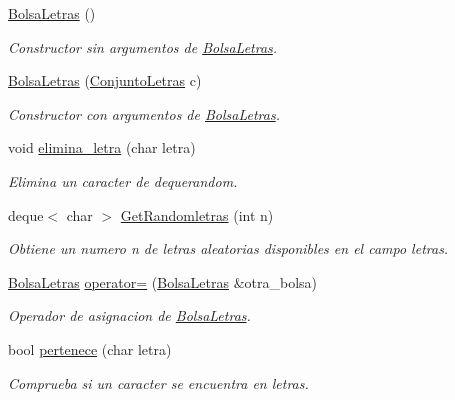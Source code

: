 \begin{DoxyCompactItemize}
\item 
\hyperlink{class_bolsa_letras_a2e269014b3a51359195e7b288a4b37c6}{Bolsa\+Letras} ()\hypertarget{class_bolsa_letras_a2e269014b3a51359195e7b288a4b37c6}{}\label{class_bolsa_letras_a2e269014b3a51359195e7b288a4b37c6}

\begin{DoxyCompactList}\small\item\em Constructor sin argumentos de \hyperlink{class_bolsa_letras}{Bolsa\+Letras}. \end{DoxyCompactList}\item 
\hyperlink{class_bolsa_letras_af412cf1648cf99bbf0e6ac897cdf6794}{Bolsa\+Letras} (\hyperlink{class_conjunto_letras}{Conjunto\+Letras} c)
\begin{DoxyCompactList}\small\item\em Constructor con argumentos de \hyperlink{class_bolsa_letras}{Bolsa\+Letras}. \end{DoxyCompactList}\item 
void \hyperlink{class_bolsa_letras_ac77fda91eebd34ba9f5b880ffe4a538b}{elimina\+\_\+letra} (char letra)
\begin{DoxyCompactList}\small\item\em Elimina un caracter de dequerandom. \end{DoxyCompactList}\item 
deque$<$ char $>$ \hyperlink{class_bolsa_letras_a8f921efe87a007d196cbf48b9fe103e9}{Get\+Randomletras} (int n)
\begin{DoxyCompactList}\small\item\em Obtiene un numero n de letras aleatorias disponibles en el campo letras. \end{DoxyCompactList}\item 
\hyperlink{class_bolsa_letras}{Bolsa\+Letras} \hyperlink{class_bolsa_letras_aba6f48dfaecf7e5635774913753d692b}{operator=} (\hyperlink{class_bolsa_letras}{Bolsa\+Letras} \&otra\+\_\+bolsa)
\begin{DoxyCompactList}\small\item\em Operador de asignacion de \hyperlink{class_bolsa_letras}{Bolsa\+Letras}. \end{DoxyCompactList}\item 
bool \hyperlink{class_bolsa_letras_a1976f62338d5216fad074e0b0fc0d6df}{pertenece} (char letra)
\begin{DoxyCompactList}\small\item\em Comprueba si un caracter se encuentra en letras. \end{DoxyCompactList}\item 

\end{DoxyCompactItemize}
